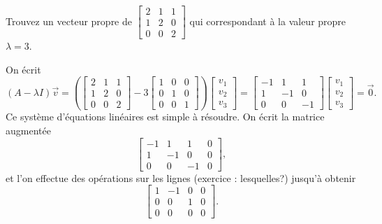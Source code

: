\begin{example}
Trouvez un vecteur propre de
$\left[ \begin{smallmatrix}
2 & 1 & 1 \\
1 & 2 & 0 \\
0 & 0 & 2
\end{smallmatrix} \right]$ qui correspondant à la valeur propre $\lambda = 3$.

On écrit
\begin{equation*}
(A-\lambda I) \vec{v} = 
\left(
\begin{bmatrix}
2 & 1 & 1 \\
1 & 2 & 0 \\
0 & 0 & 2
\end{bmatrix}
- 3
\begin{bmatrix}
1 & 0 & 0 \\
0 & 1 & 0 \\
0 & 0 & 1
\end{bmatrix}
\right)
\begin{bmatrix}
v_1 \\ v_2 \\ v_3
\end{bmatrix}
=
\begin{bmatrix}
-1 & 1 & 1 \\
1 & -1 & 0 \\
0 & 0 & -1
\end{bmatrix}
\begin{bmatrix}
v_1 \\ v_2 \\ v_3
\end{bmatrix}
=
\vec{0} .
\end{equation*}
Ce système d’équations linéaires est simple à résoudre. On écrit la matrice augmentée
\begin{equation*}
\left[
\begin{array}{ccc|c}
-1 & 1 & 1 & 0 \\
1 & -1 & 0 & 0 \\
0 & 0 & -1 & 0
\end{array}
\right] ,
\end{equation*}
et l'on effectue des opérations sur les lignes (exercice : lesquelles?) jusqu’à obtenir
\begin{equation*}
\left[
\begin{array}{ccc|c}
1 & -1 & 0 & 0 \\
0 & 0 & 1 & 0 \\
0 & 0 & 0 & 0
\end{array}
\right] .
\end{equation*}

\end{example}
